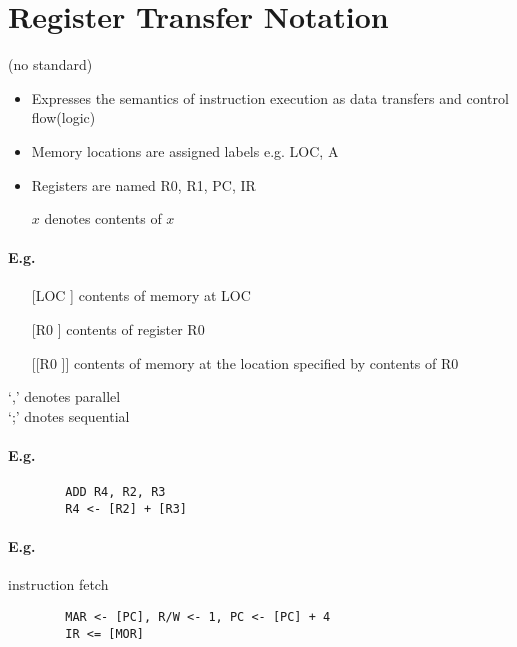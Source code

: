   \section{Register Transfer Notation}
    (no standard)
    \begin{itemize}
      \item Expresses the semantics of instruction execution as data transfers
      and control flow(logic)
      \item Memory locations are assigned labels e.g. LOC, A
      \item Registers are named R0, R1, PC, IR
      \item [$x$] denotes contents of $x$
    \end{itemize}
    \paragraph{E.g.}
    \begin{itemize}
      \item [[LOC]] contents of memory at LOC
      \item [[R0]] contents of register R0
      \item [[[R0]]] contents of memory at the location specified by contents of R0
    \end{itemize}
    `,' denotes parallel\\
    `;' dnotes sequential\\

    \paragraph{E.g.}
      \begin{lstlisting}
        ADD R4, R2, R3
        R4 <- [R2] + [R3]
      \end{lstlisting}

    \paragraph{E.g.} instruction fetch
      \begin{lstlisting}
        MAR <- [PC], R/W <- 1, PC <- [PC] + 4
        IR <= [MOR]
      \end{lstlisting}

